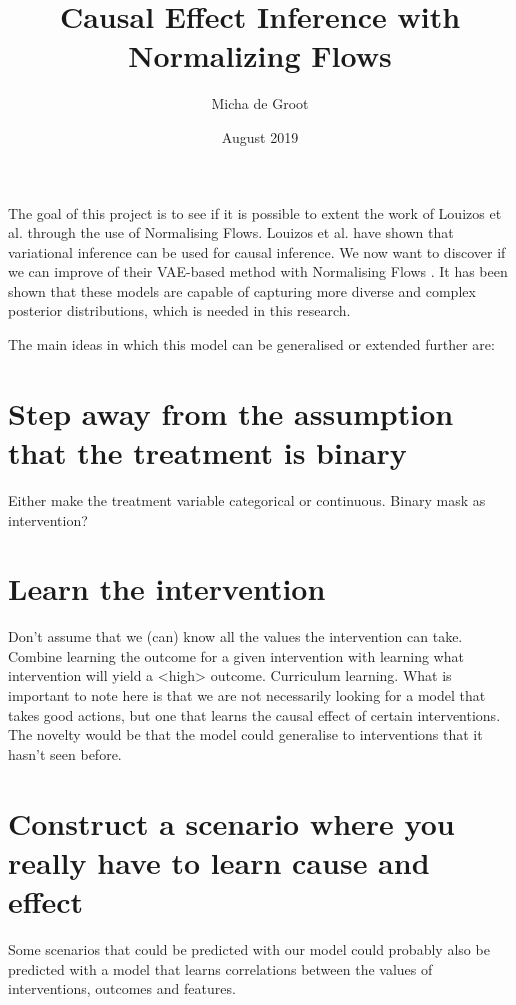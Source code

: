 \documentclass{article}
\title{Causal Effect Inference with Normalizing Flows}
\author{Micha de Groot}
\date{August 2019}
\begin{document}
\maketitle

\noindent
The goal of this project is to see if it is possible to extent the work of Louizos et al. \cite{louizos2017causal} through the use of Normalising Flows. Louizos et al. have shown that variational inference can be used for causal inference. We now want to discover if we can improve of their VAE-based \cite{kingma2013auto} method with Normalising Flows \cite{rezende2016variational}\cite{berg2018sylvester}\cite{dinh2016density}. It has been shown that these models are capable of capturing more diverse and complex posterior distributions, which is needed in this research.



The main ideas in which this model can be generalised or extended further are:
\section*{Step away from the assumption that the treatment is binary}
Either make the treatment variable categorical or continuous. Binary mask as intervention?

\section*{Learn the intervention}
Don't assume that we (can) know all the values the intervention can take. Combine learning the outcome for a given intervention with learning what intervention will yield a <high> outcome.
Curriculum learning.
What is important to note here is that we are not necessarily looking for a model that takes good actions, but one that learns the causal effect of certain interventions. The novelty would be that the model could generalise to interventions that it hasn't seen before.

\section*{Construct a scenario where you really have to learn cause and effect}
Some scenarios that could be predicted with our model could probably also be predicted with a model that learns correlations between the values of interventions, outcomes and features.




\end{document}
